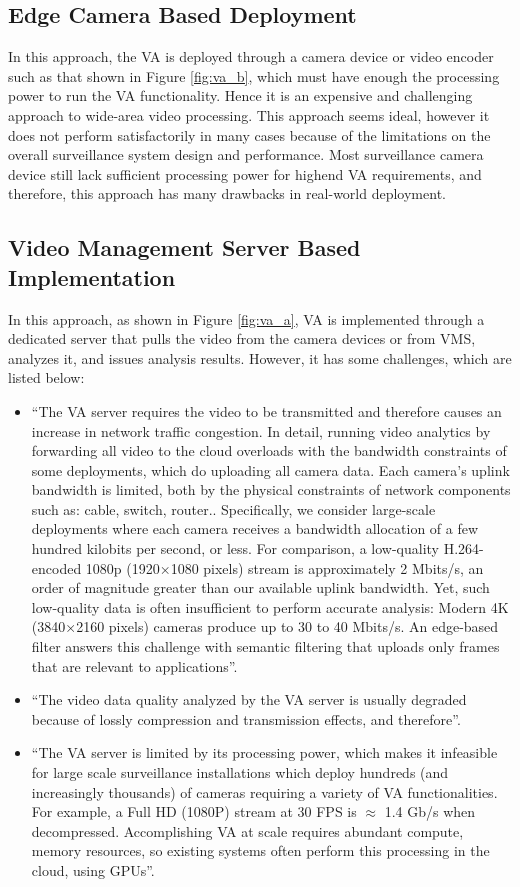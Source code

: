 \subsection{Edge Camera Based Deployment}
In this approach, the VA is deployed through a  camera device or video encoder \cite{chen2017smart} such as that shown in Figure \ref{fig:va_b}, which must have enough the processing power to run the VA functionality. Hence it is an expensive and challenging approach to wide-area video processing. This approach seems ideal, however it does not perform satisfactorily in many cases because of the limitations on the overall surveillance system design and performance. Most surveillance camera device still lack sufficient processing power for highend VA requirements, and therefore, this approach has many drawbacks in real-world deployment. 
\subsection{Video Management Server Based Implementation}
In this approach, as shown in Figure \ref{fig:va_a}, VA is implemented through a dedicated server that pulls the video from the camera devices or from VMS, analyzes it, and issues analysis results. However, it has some challenges, which are listed below:
\begin{itemize}
\item “The VA server requires the video to be transmitted and therefore causes an increase in network traffic congestion. In detail, running video analytics by forwarding all video to the cloud overloads with the bandwidth constraints of some deployments, which do uploading all camera data. Each camera’s uplink bandwidth is limited, both by the physical constraints of network components such as: cable, switch, router.. Specifically, we consider large-scale deployments where each camera receives a bandwidth allocation of a few hundred kilobits per second, or less. For comparison, a low-quality H.264-encoded 1080p (1920×1080 pixels) stream is approximately 2 Mbits/s, an order of magnitude greater than our available uplink bandwidth. Yet, such low-quality data is often insufficient to perform accurate analysis: Modern 4K (3840×2160 pixels) cameras produce up to 30 to 40 Mbits/s. An edge-based filter answers this challenge with semantic filtering that uploads only frames that are relevant to applications”.
\item “The video data quality analyzed by the VA server is usually degraded because of lossly compression and transmission effects, and therefore”.
\item “The VA server is limited by its processing power, which makes it infeasible for large scale surveillance installations which deploy hundreds (and increasingly thousands) of cameras requiring a variety of VA functionalities. For example, a Full HD (1080P) stream at 30 FPS is $\approx$ 1.4 Gb/s when decompressed. Accomplishing VA at scale requires abundant compute, memory resources, so existing systems often perform this processing in the cloud, using GPUs”.
\end{itemize}
